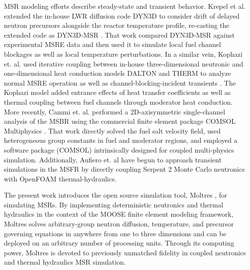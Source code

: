 \documentclass{article}
\begin{document}
\gls{MSR} modeling efforts describe steady-state and
transient behavior. Krepel et al. extended the in-house \gls{LWR}
diffusion code DYN3D to consider drift of delayed neutron precursors alongside
the reactor temperature profile, re-casting the extended code as
DYN3D-MSR \cite{krepel_dyn3d-msr_2007}. That work compared DYN3D-MSR against
experimental \gls{MSRE} data and then used it to simulate local fuel channel
blockages as well as local temperature perturbations. In a similar vein, Kophazi
et. al. used iterative coupling between in-house three-dimensional neutronic and
one-dimensional heat conduction models DALTON and THERM to analyze normal 
\gls{MSRE} operation as well as channel-blocking-incident
transients \cite{kophazi_development_2009}. The Kophazi model added entrance 
effects of heat transfer coefficients as well as thermal
coupling between fuel channels through moderator heat conduction. More recently,
Cammi et. al. performed a 2D-axisymmetric single-channel analysis of the
\gls{MSBR} using the commercial finite element package COMSOL
Multiphysics \cite{cammi_multi-physics_2011}. That work directly solved the 
fuel salt velocity field, used heterogeneous group constants
in fuel and moderator regions, and employed a software package (COMSOL)
intrinsically designed for coupled multi-physics simulation.
Additionally, Aufiero et. al \cite{aufiero_development_2014} have begun to 
approach transient simulations in the \gls{MSFR} by directly coupling Serpent 2 
Monte Carlo neutronics with OpenFOAM \cite{weller_tensorial_1998} thermal-hydraulics.

The present work introduces the open source simulation tool, Moltres
\cite{lindsay_moltres_2017}, for simulating \glspl{MSR}.  By implementing
deterministic neutronics and thermal hydraulics in the context of the
\gls{MOOSE} finite element modeling framework, Moltres solves arbitrary-group
neutron diffusion, temperature, and precursor governing equations in anywhere
from one to three dimensions and can be deployed on an arbitrary number of
processing units. Through its computing power, Moltres is devoted to previously
unmatched fidelity in coupled neutronics and thermal hydraulics \gls{MSR}
simulation.
\end{document}
